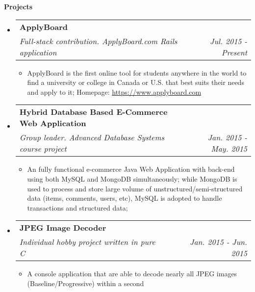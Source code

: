 \documentclass[letterpaper,10pt]{article}
\makeatletter
\newcommand{\resitem}[1]{\item #1 \vspace{-2pt}}
\newcommand{\resheading}[1]{{\large \colorbox{mygrey}{\begin{minipage}{\textwidth}{\textbf{#1 \vphantom{p\^{E}}}}\end{minipage}}}}
\newcommand{\ressubheading}[4]{
\begin{tabular*}{7.0in}{l@{\extracolsep{\fill}}r}
		\textbf{#1} & #2 \\
		\textit{#3} & \textit{#4} \\
\end{tabular*}\vspace{-6pt}}
\makeatother
\begin{document}
\resheading{Projects}
\begin{itemize}
\itemsep0em
\item
	\ressubheading{ApplyBoard}{}{Full-stack contribution. ApplyBoard.com Rails application}{Jul. 2015 - Present}
	\begin{itemize}
		\resitem{ApplyBoard is the first online tool for students anywhere in the world to find a university or college in Canada or U.S. that best suits their needs and apply to it; Homepage: \url{https://www.applyboard.com}}
	\end{itemize}
\item
	\ressubheading{Hybrid Database Based E-Commerce Web Application}{}{Group leader. Advanced Database Systems course project}{Jan. 2015 - May. 2015}
	\begin{itemize}
		\resitem{An fully functional e-commerce Java Web Application with back-end using both MySQL and MongoDB simultaneously; while MongoDB is used to process and store large volume of unstructured/semi-structured data (items, comments, users, etc), MySQL is adopted to handle transactions and structured data;}
	\end{itemize}
\item
	\ressubheading{JPEG Image Decoder}{}{Individual hobby project written in pure C}{Jan. 2015 - Jun. 2015}
	\begin{itemize}
		\resitem{A console application that are able to decode nearly all JPEG images (Baseline/Progressive) within a second}
	\end{itemize}
	
\end{itemize}
\end{document}
